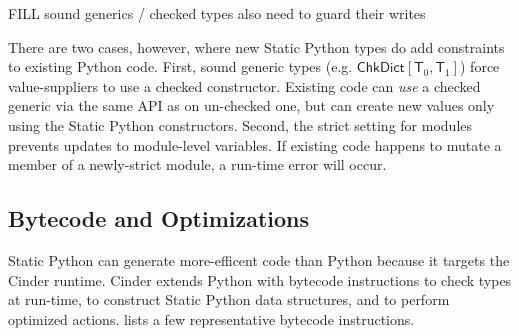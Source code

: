 \documentclass[english,cleveref,submission]{programming}
\newcommand{\SP}{Static Python}
\newcommand{\typefont}[1]{\mathsf{#1}}
\newcommand{\paramtype}[2]{#1[#2]}
\newcommand{\sptype}{\typefont{T}}
\newcommand{\sptchkdict}[2]{\paramtype{\typefont{ChkDict}}{#1, #2}}
\begin{document}
FILL sound generics / checked types also need to guard their writes

There are two cases, however, where new \SP{} types do add constraints to
existing Python code.
First, sound generic types (e.g. $\sptchkdict{\sptype_0}{\sptype_1}$)
force value-suppliers to use a checked constructor.
Existing code can \emph{use}\/ a checked generic via the same API as on
un-checked one, but can create new values only using the \SP{} constructors.
Second, the strict setting for modules prevents updates to module-level variables.
If existing code happens to mutate a member of a newly-strict module, a run-time
error will occur.


\subsection{Bytecode and Optimizations}
\label{s:optimize}

\SP{} can generate more-efficent code than Python because it targets
the Cinder runtime.
Cinder extends Python with bytecode instructions to check types at run-time,
to construct \SP{} data structures, and to perform optimized actions.
 lists a few representative bytecode instructions.
\end{document}
